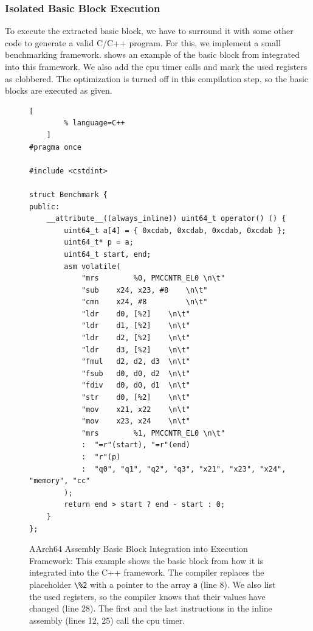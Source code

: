 \subsubsection{Isolated Basic Block Execution}
\label{sec:approach:isol_bb_exec}
To execute the extracted basic block, we have to surround it with some other code to generate a valid C/C++ program.
For this, we implement a small benchmarking framework.
 shows an example of the basic block from  integrated into this framework.
We also add the \ac{cpu} timer calls and mark the used registers as clobbered.
The optimization is turned off in this compilation step, so the basic blocks are executed as given.
\begin{figure}
    \begin{lstlisting}[
        % language=C++
    ]
#pragma once

#include <cstdint>

struct Benchmark {
public:
    __attribute__((always_inline)) uint64_t operator() () {
        uint64_t a[4] = { 0xcdab, 0xcdab, 0xcdab, 0xcdab };
        uint64_t* p = a;
        uint64_t start, end;
        asm volatile(
            "mrs        %0, PMCCNTR_EL0 \n\t"
            "sub	x24, x23, #8	\n\t"
            "cmn	x24, #8         \n\t"
            "ldr	d0, [%2]	\n\t"
            "ldr	d1, [%2]	\n\t"
            "ldr	d2, [%2]	\n\t"
            "ldr	d3, [%2]	\n\t"
            "fmul	d2, d2, d3	\n\t"
            "fsub	d0, d0, d2	\n\t"
            "fdiv	d0, d0, d1	\n\t"
            "str	d0, [%2]	\n\t"
            "mov	x21, x22	\n\t"
            "mov	x23, x24	\n\t"
            "mrs        %1, PMCCNTR_EL0 \n\t"
            :  "=r"(start), "=r"(end)
            :  "r"(p)
            :  "q0", "q1", "q2", "q3", "x21", "x23", "x24",  "memory", "cc"
        );
        return end > start ? end - start : 0;
    }
};        
    \end{lstlisting}
    \caption[Assembly Basic Block Integration Into Execution Framework]{AArch64 Assembly Basic Block Integration into Execution Framework:
    This example shows the basic block from  how it is integrated into the C++ framework.
    The compiler replaces the placeholder \lstinline|\%2| with a pointer to the array \lstinline|a| (line 8).
    We also list the used registers, so the compiler knows that their values have changed (line 28).
    The first and the last instructions in the inline assembly (lines 12, 25) call the \ac{cpu} timer.}
    \label{fig:approach:bb-executable}
\end{figure}

